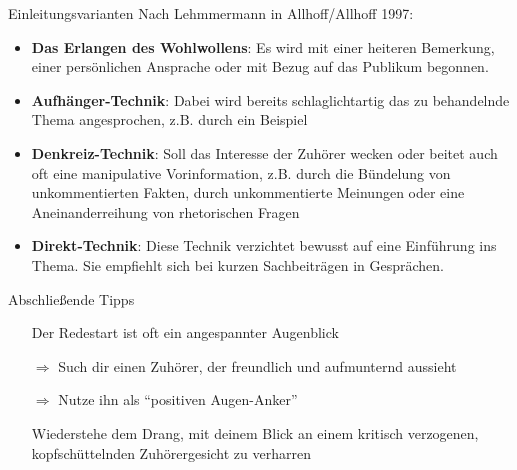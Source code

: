 \begin{frame}{Einleitungsvarianten}
    Nach Lehmmermann in Allhoff/Allhoff 1997:
    \begin{itemize}[<+->]
        \item \textbf{Das Erlangen des Wohlwollens}: Es wird mit einer
              heiteren Bemerkung, einer persönlichen Ansprache oder mit
              Bezug auf das Publikum begonnen.
        \item \textbf{Aufhänger-Technik}: Dabei wird bereits schlaglichtartig
              das zu behandelnde Thema angesprochen, z.B. durch ein
              Beispiel
        \item \textbf{Denkreiz-Technik}: Soll das Interesse der
              Zuhörer wecken oder beitet auch oft eine manipulative
              Vorinformation, z.B. durch die Bündelung von
              unkommentierten Fakten, durch unkommentierte Meinungen
              oder eine Aneinanderreihung von rhetorischen Fragen
        \item \textbf{Direkt-Technik}: Diese Technik verzichtet
              bewusst auf eine Einführung ins Thema. Sie empfiehlt
              sich bei kurzen Sachbeiträgen in Gesprächen.
    \end{itemize}
\end{frame}

\begin{frame}{Abschließende Tipps}
    \begin{itemize}[<+->]
        \item[] Der Redestart ist oft ein angespannter Augenblick
        \item[$\Rightarrow$] Such dir einen Zuhörer, der freundlich und aufmunternd aussieht
        \item[$\Rightarrow$] Nutze ihn als "`positiven Augen-Anker"'
        \item[] Wiederstehe dem Drang, mit deinem Blick an einem
                kritisch verzogenen, kopfschüttelnden Zuhörergesicht zu verharren
    \end{itemize}
\end{frame}
